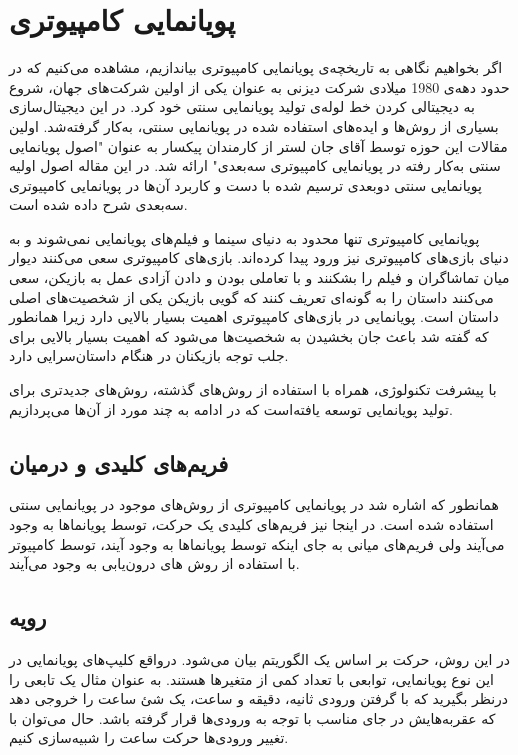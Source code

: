 \section{پویانمایی کامپیوتری}

اگر بخواهیم نگاهی به تاریخچه‌ی پویانمایی کامپیوتری بیاندازیم، مشاهده می‌کنیم که 
در حدود دهه‌ی 1980 میلادی شرکت دیزنی به عنوان یکی از اولین شرکت‌های جهان، شروع به 
دیجیتالی کردن خط لوله‌ی تولید پویانمایی سنتی خود کرد.
در این دیجیتال‌سازی بسیاری از روش‌ها و ایده‌‌های استفاده شده در پویانمایی سنتی،
به‌کار گرفته‌شد.
اولین مقالات این حوزه توسط آقای جان لستر از کارمندان پیکسار به عنوان 
"اصول پویانمایی سنتی به‌کار رفته در پویانمایی کامپیوتری سه‌بعدی"
ارائه شد.
در این مقاله اصول اولیه پویانمایی سنتی دوبعدی ترسیم شده با دست
و کاربرد آن‌ها در پویانمایی کامپیوتری سه‌بعدی شرح داده شده است.
\cite{Lasseter1987animation}
 
پویانمایی کامپیوتری تنها محدود به دنیای سینما و فیلم‌های پویانمایی نمی‌شوند و به دنیای
بازی‌های کامپیوتری نیز ورود پیدا کرده‌اند. بازی‌های کامپیوتری سعی می‌کنند دیوار میان تماشاگران و فیلم را بشکنند و 
با تعاملی بودن و دادن آزادی عمل به بازیکن، سعی می‌کنند داستان را به گونه‌ای تعریف کنند که گویی بازیکن یکی از شخصیت‌های اصلی داستان است.
پویانمایی در بازی‌های کامپیوتری اهمیت بسیار بالایی دارد زیرا همانطور که گفته شد باعث 
جان بخشیدن به شخصیت‌ها می‌شود که اهمیت بسیار بالایی برای جلب توجه بازیکنان در هنگام داستان‌سرایی دارد.

با پیشرفت تکنولوژی، همراه با استفاده از روش‌های گذشته، روش‌های جدیدتری برای تولید پویانمایی توسعه یافته‌است که 
در ادامه به چند مورد از آن‌‌ها می‌پردازیم.

\subsection{فریم‌های کلیدی و درمیان}

همانطور که اشاره شد در پویانمایی کامپیوتری از روش‌های موجود در 
پویانمایی سنتی استفاده شده است. در اینجا نیز فریم‌های کلیدی 
یک حرکت، توسط پویانماها به وجود می‌‌آیند ولی فریم‌های میانی به جای اینکه توسط پویانماها به وجود آیند،
توسط کامپیوتر با استفاده از روش های درون‌یابی به وجود می‌آیند.

\subsection{رویه}

در این روش، حرکت بر اساس یک الگوریتم بیان می‌شود.
درواقع کلیپ‌های پویانمایی در این نوع پویانمایی، توابعی با تعداد کمی از متغیر‌ها هستند.
به عنوان مثال یک تابعی را درنظر بگیرید که با گرفتن ورودی ثانیه، دقیقه و ساعت، 
یک شئ ساعت را خروجی دهد که عقربه‌هایش در جای مناسب با توجه به ورودی‌ها قرار گرفته باشد.
حال می‌توان با تغییر ورودی‌ها حرکت ساعت را شبیه‌سازی کنیم.


